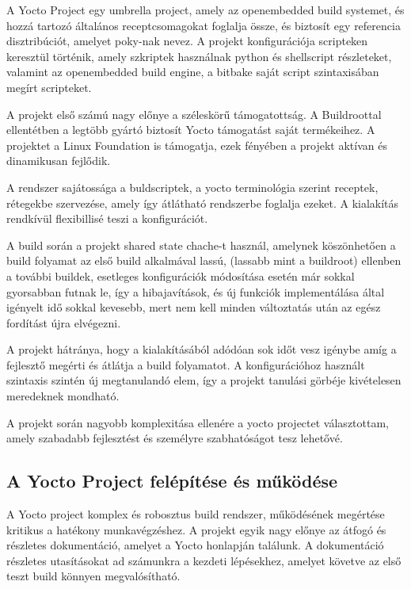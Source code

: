A Yocto Project egy umbrella project, amely az openembedded build systemet, és
hozzá tartozó általános receptcsomagokat foglalja össze, és biztosít egy
referencia disztribúciót, amelyet poky-nak nevez. A projekt konfigurációja
scripteken keresztül történik, amely szkriptek használnak python és shellscript
részleteket, valamint az openembedded build engine, a bitbake saját script
szintaxisában megírt scripteket.

A projekt első számú nagy előnye a széleskörű támogatottság. A Buildroottal
ellentétben a legtöbb gyártó biztosít Yocto támogatást saját termékeihez. A
projektet a Linux Foundation is támogatja, ezek fényében a projekt aktívan és
dinamikusan fejlődik. 

A rendszer sajátossága a buldscriptek, a yocto terminológia szerint receptek,
rétegekbe szervezése, amely így átlátható rendszerbe foglalja ezeket. A
kialakítás rendkívül flexibillisé teszi a konfigurációt.

A build során a projekt shared state chache-t használ, amelynek köszönhetően a
build folyamat az első build alkalmával lassú, (lassabb mint a buildroot)
ellenben a további buildek, esetleges konfigurációk módosítása esetén már sokkal
gyorsabban futnak le, így a hibajavítások, és új funkciók implementálása által
igényelt idő sokkal kevesebb, mert nem kell minden változtatás után az egész
fordítást újra elvégezni.  

A projekt hátránya, hogy a kialakításából adódóan sok időt vesz igénybe amíg a
fejlesztő megérti és átlátja a build folyamatot. A konfigurációhoz használt
szintaxis szintén új megtanulandó elem, így a projekt tanulási görbéje
kivételesen meredeknek mondható.

\medskip

A projekt során nagyobb komplexitása ellenére a yocto projectet választottam,
amely szabadabb fejlesztést és személyre szabhatóságot tesz lehetővé.

\subsection{A Yocto Project felépítése és működése}

A Yocto project komplex és robosztus build rendszer, működésének megértése
kritikus a hatékony munkavégzéshez. A projekt egyik nagy előnye az átfogó és
részletes dokumentáció, amelyet a Yocto honlapján
találunk. A dokumentáció részletes utasításokat ad számunkra a kezdeti
lépésekhez, amelyet követve az első teszt build könnyen megvalósítható.

